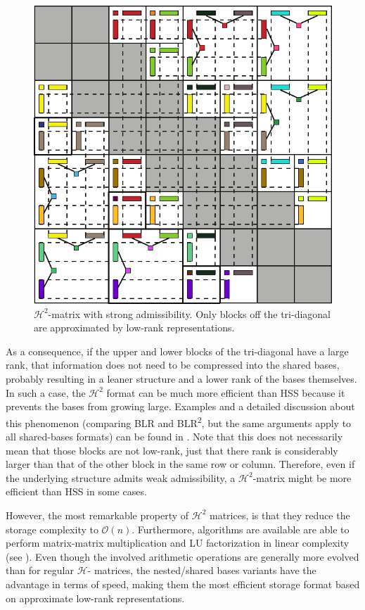 \begin{figure}[h]
    \centering
    \includegraphics[width=0.6\linewidth]{chapters/4_hierarchical_matrices/figures/H2_matrix.pdf}
    \caption[\texorpdfstring{$\mathcal{H}^2$}{H2}-matrix]{$\mathcal{H}^2$-matrix with strong admissibility. Only blocks off the tri-diagonal are approximated by low-rank representations.}
    \label{fig:h2_matrix}
\end{figure}

As a consequence, if the upper and lower blocks of the tri-diagonal have a large rank, that information does not need to be compressed into the shared bases, probably resulting in a leaner structure and a lower rank of the bases themselves. In such a case, the $\mathcal{H}^2$ format can be much more efficient than HSS because it prevents the bases from growing large. Examples and a detailed discussion about this phenomenon (comparing BLR and BLR\textsuperscript{2}, but the same arguments apply to all shared-bases formats) can be found in \cite{ashcraft_block_2020}. Note that this does not necessarily mean that those blocks are not low-rank, just that there rank is considerably larger than that of the other block in the same row or column. Therefore, even if the underlying structure admits weak admissibility, a $\mathcal{H}^2$-matrix might be more efficient than HSS in some cases.

However, the most remarkable property of $\mathcal{H}^2$ matrices, is that they reduce the storage complexity to $\mathcal{O}(n)$. Furthermore, algorithms are available are able to perform matrix-matrix multiplication and LU factorization in linear complexity (see \cite{borm_h2-matrix_2006}). Even though the involved arithmetic operations are generally more evolved than for regular $\mathcal{H}$- matrices, the nested/shared bases variants have the advantage in terms of speed, making them the most efficient storage format based on approximate low-rank representations.